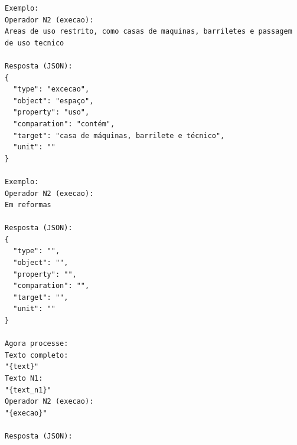 \begin{apendicesenv}
\begin{lstlisting}[caption={\textit{Prompt} do operador Exceção (N3): \texttt{prompts/n3\_execao.txt}.}, label={lst:n3-exc}]
Exemplo:
Operador N2 (execao):
Areas de uso restrito, como casas de maquinas, barriletes e passagem de uso tecnico

Resposta (JSON):
{
  "type": "excecao",
  "object": "espaço",
  "property": "uso",
  "comparation": "contém",
  "target": "casa de máquinas, barrilete e técnico",
  "unit": ""
}

Exemplo:
Operador N2 (execao):
Em reformas

Resposta (JSON):
{
  "type": "",
  "object": "",
  "property": "",
  "comparation": "",
  "target": "",
  "unit": ""
}

Agora processe:
Texto completo:
"{text}"
Texto N1:
"{text_n1}"
Operador N2 (execao):
"{execao}"

Resposta (JSON):
\end{lstlisting}

\end{apendicesenv}
